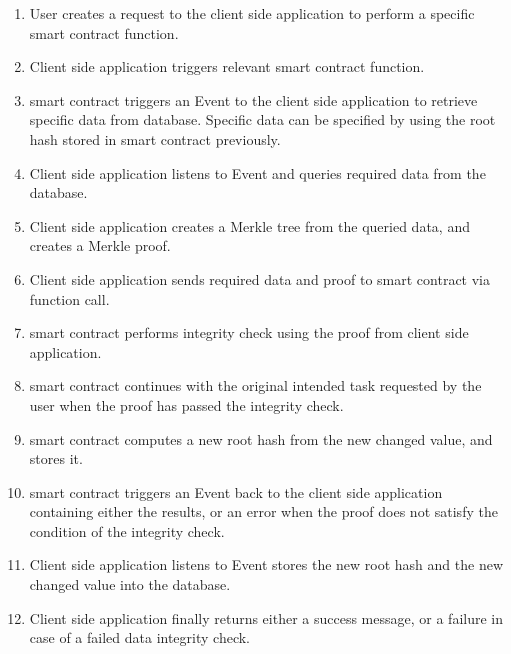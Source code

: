 \begin{enumerate}
\item User creates a request to the client side application to perform a specific smart contract function. 
\item Client side application triggers relevant smart contract function.
\item smart contract triggers an Event to the client side application to retrieve specific data from database. Specific data can be specified by using the root hash stored in smart contract previously.
\item Client side application listens to Event and queries required data from the database.
\item Client side application creates a Merkle tree from the queried data, and creates a Merkle proof.
\item Client side application sends required data and proof to smart contract via function call.
\item smart contract performs integrity check using the proof from client side application.
\item smart contract continues with the original intended task requested by the user when the proof has passed the integrity check. 
\item smart contract computes a new root hash from the new changed value, and stores it.
\item smart contract triggers an Event back to the client side application containing either the results, or an error when the proof does not satisfy the condition of the integrity check. 
\item Client side application listens to Event stores the new root hash and the new changed value into the database. 
\item Client side application finally returns either a success message, or a failure in case of a failed data integrity check. 
\end{enumerate}
